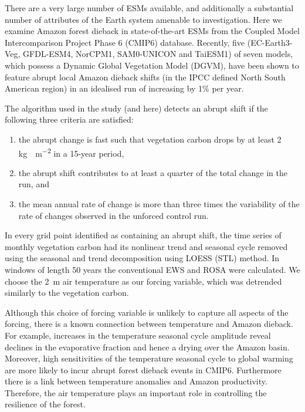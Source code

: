There are a very large number of ESMs available, and additionally a substantial number of attributes of the Earth system amenable to investigation. Here we 
examine Amazon forest dieback in state-of-the-art ESMs from the Coupled Model Intercomparison  Project Phase 6 (CMIP6)\cite{Eyring2016} database. Recently,
five (EC-Earth3-Veg, GFDL-ESM4, NorCPM1, SAM0-UNICON and TaiESM1) of seven models, which possess a Dynamic Global Vegetation Model
(DGVM), have been shown to feature abrupt local Amazon dieback shifts (in the IPCC defined North South American region) in an idealised run
of increasing  by 1\% per year\cite{Parry2022}.

The algorithm used in the study (and here) detects an abrupt shift if the following three criteria are satisfied:
\begin{enumerate}
\item the abrupt change is fast such that vegetation carbon drops by at least 2 \si{\kilogram\carbon\per\meter\squared} in a 15-year period,
\item the abrupt shift contributes to at least a quarter of the total change in the run, and
\item the mean annual rate of change is more than three times the variability of the rate of changes observed in the unforced control run. 
\end{enumerate}
In every grid point identified as containing an abrupt shift, the time series of monthly vegetation carbon had its nonlinear trend and seasonal cycle removed
using the seasonal and trend decomposition using
LOESS (STL) method\cite{Cleaveland1990}. In 
windows of length 50 years the conventional EWS and ROSA were calculated.
We choose the \si{2\meter} air temperature as our forcing variable, which
was detrended similarly to the vegetation carbon. 

Although this choice of forcing variable is unlikely to capture all aspects
of the forcing, there is a known connection between temperature and Amazon 
dieback. For example, increases in the temperature seasonal cycle amplitude reveal declines in the evaporative fraction and hence a drying over the Amazon basin\cite{Ritchie2022}.
Moreover, high sensitivities of the temperature seasonal cycle to global warming are more likely to incur abrupt forest dieback events\cite{Parry2022} in CMIP6.
Furthermore there is a link between temperature anomalies and Amazon productivity\cite{Boulton2013}.
Therefore, the air temperature plays an important role in controlling the resilience of the forest.

